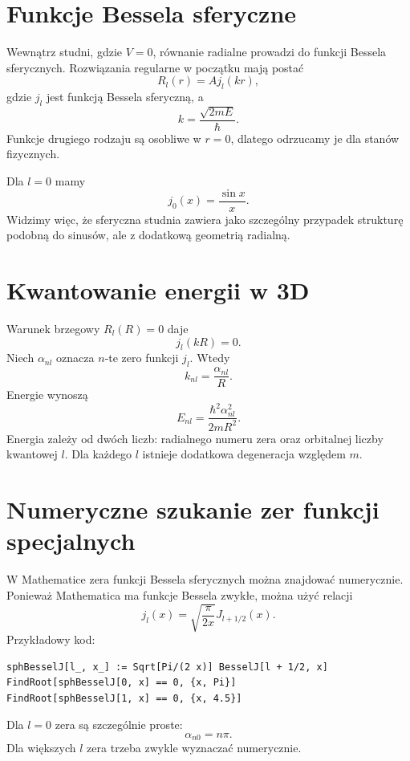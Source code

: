 \section{Funkcje Bessela sferyczne}

Wewnątrz studni, gdzie \(V=0\), równanie radialne prowadzi do funkcji Bessela sferycznych. Rozwiązania regularne w początku mają postać
\begin{equation}
    R_{l}(r)=A j_l(kr),
\end{equation}
gdzie \(j_l\) jest funkcją Bessela sferyczną, a
\begin{equation}
    k=\frac{\sqrt{2mE}}{\hbar}.
\end{equation}
Funkcje drugiego rodzaju są osobliwe w \(r=0\), dlatego odrzucamy je dla stanów fizycznych.

Dla \(l=0\) mamy
\begin{equation}
    j_0(x)=\frac{\sin x}{x}.
\end{equation}
Widzimy więc, że sferyczna studnia zawiera jako szczególny przypadek strukturę podobną do sinusów, ale z dodatkową geometrią radialną.

\section{Kwantowanie energii w 3D}

Warunek brzegowy \(R_l(R)=0\) daje
\begin{equation}
    j_l(kR)=0.
\end{equation}
Niech \(\alpha_{nl}\) oznacza \(n\)-te zero funkcji \(j_l\). Wtedy
\begin{equation}
    k_{nl}=\frac{\alpha_{nl}}{R}.
\end{equation}
Energie wynoszą
\begin{equation}
    E_{nl}=\frac{\hbar^2\alpha_{nl}^2}{2mR^2}.
\end{equation}
Energia zależy od dwóch liczb: radialnego numeru zera oraz orbitalnej liczby kwantowej \(l\). Dla każdego \(l\) istnieje dodatkowa degeneracja względem \(m\).

\section{Numeryczne szukanie zer funkcji specjalnych}

W Mathematice zera funkcji Bessela sferycznych można znajdować numerycznie. Ponieważ Mathematica ma funkcje Bessela zwykłe, można użyć relacji
\begin{equation}
    j_l(x)=\sqrt{\frac{\pi}{2x}}J_{l+1/2}(x).
\end{equation}
Przykładowy kod:
\begin{verbatim}
sphBesselJ[l_, x_] := Sqrt[Pi/(2 x)] BesselJ[l + 1/2, x]
FindRoot[sphBesselJ[0, x] == 0, {x, Pi}]
FindRoot[sphBesselJ[1, x] == 0, {x, 4.5}]
\end{verbatim}
Dla \(l=0\) zera są szczególnie proste:
\begin{equation}
    \alpha_{n0}=n\pi.
\end{equation}
Dla większych \(l\) zera trzeba zwykle wyznaczać numerycznie.


